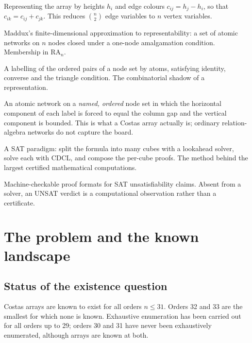 \documentclass[11pt,a4paper]{article}
\theoremstyle{definition}
\newcommand{\RA}{\mathrm{RA}}
\begin{document}
\begin{description}[style=nextline,leftmargin=0pt]
\item[Vertex potential / cocycle formulation] Representing the array by heights
$h_i$ and edge colours $c_{ij}=h_j-h_i$, so that $c_{ik}=c_{ij}+c_{jk}$. This
reduces $\binom{n}{2}$ edge variables to $n$ vertex variables.

\item[Relational basis] Maddux's finite-dimensional approximation to
representability: a set of atomic networks on $n$ nodes closed under a
one-node amalgamation condition. Membership in $\RA_n$.

\item[Atomic network] A labelling of the ordered pairs of a node set by atoms,
satisfying identity, converse and the triangle condition. The combinatorial
shadow of a representation.

\item[Board-relative network] An atomic network on a \emph{named, ordered} node
set in which the horizontal component of each label is forced to equal the
column gap and the vertical component is bounded. This is what a Costas array
actually is; ordinary relation-algebra networks do not capture the board.

\item[Cube-and-conquer] A SAT paradigm: split the formula into many cubes with a
lookahead solver, solve each with CDCL, and compose the per-cube proofs. The
method behind the largest certified mathematical computations.

\item[DRAT / LRAT] Machine-checkable proof formats for SAT unsatisfiability
claims. Absent from a solver, an UNSAT verdict is a computational observation
rather than a certificate.

\end{description}

\section{The problem and the known landscape}
\label{sec:landscape}

\subsection{Status of the existence question}

Costas arrays are known to exist for all orders $n \le 31$. Orders 32 and 33 are
the smallest for which none is known. Exhaustive enumeration has been carried
out for all orders up to 29; orders 30 and 31 have never been exhaustively
enumerated, although arrays are known at both.
\end{document}
